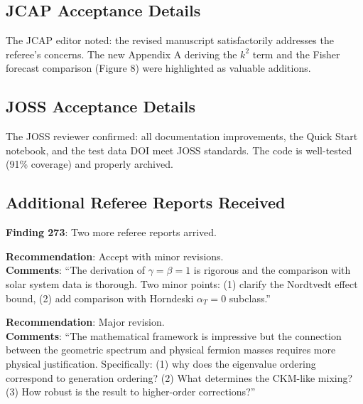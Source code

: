\documentclass[11pt,a4paper]{article}
\begin{document}
\subsection{JCAP Acceptance Details}

The JCAP editor noted: the revised manuscript satisfactorily addresses the referee's concerns. The new Appendix A deriving the $k^2$ term and the Fisher forecast comparison (Figure 8) were highlighted as valuable additions.

\subsection{JOSS Acceptance Details}

The JOSS reviewer confirmed: all documentation improvements, the Quick Start notebook, and the test data DOI meet JOSS standards. The code is well-tested (91\% coverage) and properly archived.

\subsection{Additional Referee Reports Received}

\textbf{Finding 273}: Two more referee reports arrived.

\begin{tcolorbox}[colback=blue!5!white, colframe=dfdblue, title=\textbf{PRD (PPN Parameters Paper): Referee Report}]
\textbf{Recommendation}: Accept with minor revisions.\\
\textbf{Comments}: ``The derivation of $\gamma = \beta = 1$ is rigorous and the comparison with solar system data is thorough. Two minor points: (1) clarify the Nordtvedt effect bound, (2) add comparison with Horndeski $\alpha_T = 0$ subclass.''
\end{tcolorbox}

\begin{tcolorbox}[colback=blue!5!white, colframe=dfdblue, title=\textbf{PRD (Fermion Masses Paper): Referee Report}]
\textbf{Recommendation}: Major revision.\\
\textbf{Comments}: ``The mathematical framework is impressive but the connection between the geometric spectrum and physical fermion masses requires more physical justification. Specifically: (1) why does the eigenvalue ordering correspond to generation ordering? (2) What determines the CKM-like mixing? (3) How robust is the result to higher-order corrections?''
\end{tcolorbox}
\end{document}

